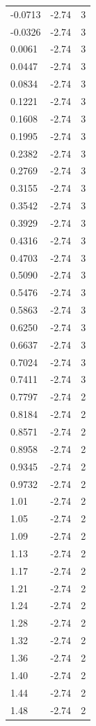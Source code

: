 \begin{longtable}{lrr}
  -0.0713 & -2.74 & 3 \\
  -0.0326 & -2.74 & 3 \\
  0.0061 & -2.74 & 3 \\
  0.0447 & -2.74 & 3 \\
  0.0834 & -2.74 & 3 \\
  0.1221 & -2.74 & 3 \\
  0.1608 & -2.74 & 3 \\
  0.1995 & -2.74 & 3 \\
  0.2382 & -2.74 & 3 \\
  0.2769 & -2.74 & 3 \\
  0.3155 & -2.74 & 3 \\
  0.3542 & -2.74 & 3 \\
  0.3929 & -2.74 & 3 \\
  0.4316 & -2.74 & 3 \\
  0.4703 & -2.74 & 3 \\
  0.5090 & -2.74 & 3 \\
  0.5476 & -2.74 & 3 \\
  0.5863 & -2.74 & 3 \\
  0.6250 & -2.74 & 3 \\
  0.6637 & -2.74 & 3 \\
  0.7024 & -2.74 & 3 \\
  0.7411 & -2.74 & 3 \\
  0.7797 & -2.74 & 2 \\
  0.8184 & -2.74 & 2 \\
  0.8571 & -2.74 & 2 \\
  0.8958 & -2.74 & 2 \\
  0.9345 & -2.74 & 2 \\
  0.9732 & -2.74 & 2 \\
  1.01 & -2.74 & 2 \\
  1.05 & -2.74 & 2 \\
  1.09 & -2.74 & 2 \\
  1.13 & -2.74 & 2 \\
  1.17 & -2.74 & 2 \\
  1.21 & -2.74 & 2 \\
  1.24 & -2.74 & 2 \\
  1.28 & -2.74 & 2 \\
  1.32 & -2.74 & 2 \\
  1.36 & -2.74 & 2 \\
  1.40 & -2.74 & 2 \\
  1.44 & -2.74 & 2 \\
  1.48 & -2.74 & 2 \\

\end{longtable}
